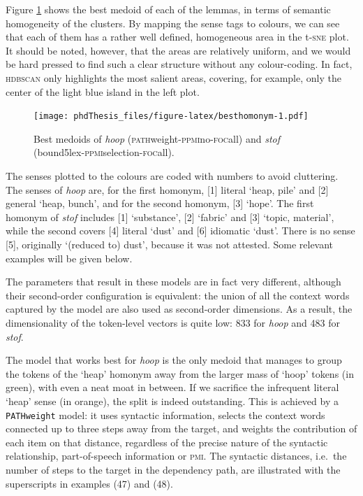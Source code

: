 \documentclass[
]{book}
\begin{document}
Figure \ref{fig:besthomonym} shows the best medoid of each of the lemmas, in terms of semantic homogeneity of the clusters. By mapping the sense tags to colours, we can see that each of them has a rather well defined, homogeneous area in the t-\textsc{sne} plot. It should be noted, however, that the areas are relatively uniform, and we would be hard pressed to find such a clear structure without any colour-coding. In fact, \textsc{hdbscan} only highlights the most salient areas, covering, for example, only the center of the light blue island in the left plot.



\begin{figure}
\centering
\texttt{[image: phdThesis\_files/figure-latex/besthomonym-1.pdf]}
\caption{\label{fig:besthomonym}Best medoids of \emph{hoop} (\textsc{path}weight-\textsc{ppmi}no-\textsc{foc}all) and \emph{stof} (bound5lex-\textsc{ppmi}selection-\textsc{foc}all).}
\end{figure}

The senses plotted to the colours are coded with numbers to avoid cluttering. The senses of \emph{hoop} are, for the first homonym, {[}1{]} literal `heap, pile' and {[}2{]} general `heap, bunch', and for the second homonym, {[}3{]} `hope'. The first homonym of \emph{stof} includes {[}1{]} `substance', {[}2{]} `fabric' and {[}3{]} `topic, material', while the second covers {[}4{]} literal `dust' and {[}6{]} idiomatic `dust'. There is no sense {[}5{]}, originally `(reduced to) dust', because it was not attested.
Some relevant examples will be given below.

The parameters that result in these models are in fact very different, although their second-order configuration is equivalent: the union of all the context words captured by the model are also used as second-order dimensions. As a result, the dimensionality of the token-level vectors is quite low: 833 for \emph{hoop} and 483 for \emph{stof}.

The model that works best for \emph{hoop} is the only medoid that manages to group the tokens of the `heap' homonym away from the larger mass of `hoop' tokens (in green), with even a neat moat in between. If we sacrifice the infrequent literal `heap' sense (in orange), the split is indeed outstanding. This is achieved by a \texttt{PATHweight} model: it uses syntactic information, selects the context words connected up to three steps away from the target, and weights the contribution of each item on that distance, regardless of the precise nature of the syntactic relationship, part-of-speech information or \textsc{pmi}. The syntactic distances, i.e.~the number of steps to the target in the dependency path, are illustrated with the superscripts in examples (47) and (48).
\end{document}

